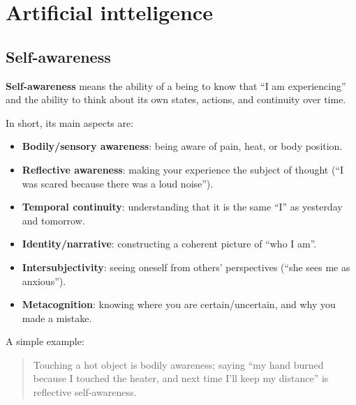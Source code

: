 \chapter{Artificial intteligence}

\section{Self-awareness}
    \noindent
    \textbf{Self-awareness} means the ability of a being to know that ``I am experiencing'' and the ability to think about its own states, actions, and continuity over time.
    
    \medskip
    \noindent
    In short, its main aspects are:
    \begin{itemize}
        \item \textbf{Bodily/sensory awareness}: being aware of pain, heat, or body position.
        \item \textbf{Reflective awareness}: making your experience the subject of thought (``I was scared because there was a loud noise'').
        \item \textbf{Temporal continuity}: understanding that it is the same ``I'' as yesterday and tomorrow.
        \item \textbf{Identity/narrative}: constructing a coherent picture of ``who I am''.
        \item \textbf{Intersubjectivity}: seeing oneself from others’ perspectives (``she sees me as anxious'').
        \item \textbf{Metacognition}: knowing where you are certain/uncertain, and why you made a mistake.
    \end{itemize}
    
    \noindent
    A simple example:
    \begin{quote}
        Touching a hot object is bodily awareness; saying ``my hand burned because I touched the heater, and next time I’ll keep my distance'' is reflective self-awareness.
    \end{quote}

    
    
    